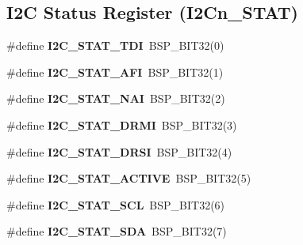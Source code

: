 \subsection*{I2C Status Register (I2\+Cn\+\_\+\+S\+T\+AT)}
\begin{DoxyCompactItemize}
\item 
\mbox{\label{group__lpc32xx__i2c_gae1c5966efb3042cb559afd2e8fca9e72}} 
\#define {\bfseries I2\+C\+\_\+\+S\+T\+A\+T\+\_\+\+T\+DI}~B\+S\+P\+\_\+\+B\+I\+T32(0)
\item 
\mbox{\label{group__lpc32xx__i2c_gac86fadf9b42db41accc931c7688d0b1e}} 
\#define {\bfseries I2\+C\+\_\+\+S\+T\+A\+T\+\_\+\+A\+FI}~B\+S\+P\+\_\+\+B\+I\+T32(1)
\item 
\mbox{\label{group__lpc32xx__i2c_ga654d9a73461d7ce9177d291659ecbb7e}} 
\#define {\bfseries I2\+C\+\_\+\+S\+T\+A\+T\+\_\+\+N\+AI}~B\+S\+P\+\_\+\+B\+I\+T32(2)
\item 
\mbox{\label{group__lpc32xx__i2c_gad6d8d57b618087cc16da128242e69260}} 
\#define {\bfseries I2\+C\+\_\+\+S\+T\+A\+T\+\_\+\+D\+R\+MI}~B\+S\+P\+\_\+\+B\+I\+T32(3)
\item 
\mbox{\label{group__lpc32xx__i2c_gabdcccb8a18a82b7bb26592a9baf24c08}} 
\#define {\bfseries I2\+C\+\_\+\+S\+T\+A\+T\+\_\+\+D\+R\+SI}~B\+S\+P\+\_\+\+B\+I\+T32(4)
\item 
\mbox{\label{group__lpc32xx__i2c_ga913977afa3e26a50064132566cc5ea99}} 
\#define {\bfseries I2\+C\+\_\+\+S\+T\+A\+T\+\_\+\+A\+C\+T\+I\+VE}~B\+S\+P\+\_\+\+B\+I\+T32(5)
\item 
\mbox{\label{group__lpc32xx__i2c_gaf06367f924ac0a93b91b7ca458f553f3}} 
\#define {\bfseries I2\+C\+\_\+\+S\+T\+A\+T\+\_\+\+S\+CL}~B\+S\+P\+\_\+\+B\+I\+T32(6)
\item 
\mbox{\label{group__lpc32xx__i2c_gae18d56c314d59b461cdc0acbf7fb4e0b}} 
\#define {\bfseries I2\+C\+\_\+\+S\+T\+A\+T\+\_\+\+S\+DA}~B\+S\+P\+\_\+\+B\+I\+T32(7)
\item 
\mbox{\label{group__lpc32xx__i2c_ga65d7feab266bf65ae8d81d5a153eb52b}} 

\end{DoxyCompactItemize}

